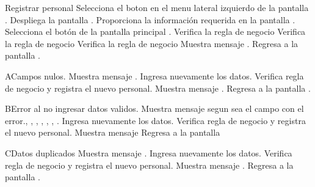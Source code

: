 	\begin{UCtrayectoria}{Registrar personal}
		\UCpaso[\UCactor] Selecciona el boton  en el menu lateral izquierdo de la pantalla .
		\UCpaso[\UCsist] Despliega la pantalla .
		\UCpaso[\UCactor] Proporciona la información requerida en la pantalla .
		\UCpaso[\UCactor] Selecciona el botón  de la pantalla principal .
		\UCpaso[\UCsist] Verifica la regla de negocio   
		\UCpaso[\UCsist] Verifica la regla de negocio  
		\UCpaso[\UCsist] Verifica la regla de negocio  
		\UCpaso[\UCsist] Muestra mensaje .
		\UCpaso[\UCsist] Regresa a la pantalla .
	\end{UCtrayectoria}
	\begin{UCtrayectoriaA}{A}{Campos nulos.}
		\UCpaso[\UCsist] Muestra mensaje .
			\UCpaso[\UCactor] Ingresa nuevamente los datos.
			\UCpaso[\UCsist] Verifica regla de negocio  y registra el nuevo personal. 
		\UCpaso[\UCsist] Muestra mensaje .
		\UCpaso[\UCsist] Regresa a la pantalla .
	\end{UCtrayectoriaA}
	\begin{UCtrayectoriaA}{B}{Error al no ingresar datos validos.}
		\UCpaso[\UCsist] Muestra mensaje segun sea el campo con el error., , , , , , .
			\UCpaso[\UCactor] Ingresa nuevamente los datos.
			\UCpaso[\UCsist] Verifica regla de negocio  y registra el nuevo personal. 
		\UCpaso[\UCsist] Muestra mensaje 
		\UCpaso[\UCsist] Regresa a la pantalla 
	\end{UCtrayectoriaA}
	\begin{UCtrayectoriaA}{C}{Datos duplicados}
		\UCpaso[\UCsist] Muestra mensaje .
			\UCpaso[\UCactor] Ingresa nuevamente los datos.
			\UCpaso[\UCsist] Verifica regla de negocio  y registra el nuevo personal. 
		\UCpaso[\UCsist] Muestra mensaje .
		\UCpaso[\UCsist] Regresa a la pantalla .
	\end{UCtrayectoriaA}